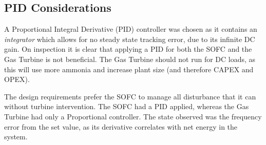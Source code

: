 \subsection{PID Considerations}
\label{sec:power-pid}

A Proportional Integral Derivative (PID) controller was chosen as it contains an \emph{integrator} which allows for no steady state tracking error, due to its infinite DC gain.
On inspection it is clear that applying a PID for both the SOFC and the Gas Turbine is not beneficial.
The Gas Turbine should not run for DC loads, as this will use more ammonia and increase plant size (and therefore CAPEX and OPEX).

The design requirements prefer the SOFC to manage all disturbance that it can without turbine intervention. The SOFC had a PID applied, whereas the Gas Turbine had only a Proportional controller.
The state observed was the frequency error from the set value, as its derivative correlates with net energy in the system.

